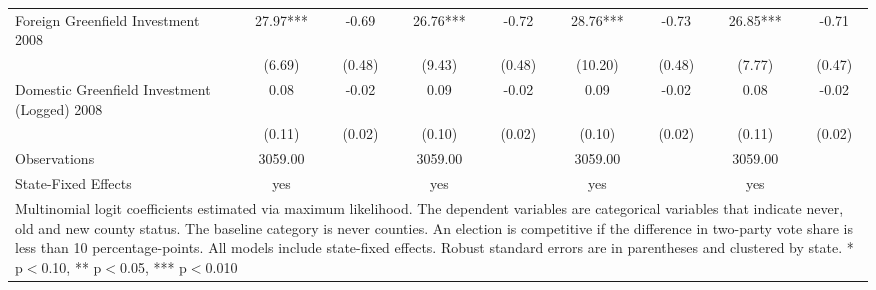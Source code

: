 \begin{table}[!htbp]
\begin{tabular}{l*{8}{c}}
Foreign Greenfield Investment 2008&       27.97***&       -0.69   &       26.76***&       -0.72   &       28.76***&       -0.73   &       26.85***&       -0.71   \\
                    &      (6.69)   &      (0.48)   &      (9.43)   &      (0.48)   &     (10.20)   &      (0.48)   &      (7.77)   &      (0.47)   \\
Domestic Greenfield Investment (Logged) 2008&        0.08   &       -0.02   &        0.09   &       -0.02   &        0.09   &       -0.02   &        0.08   &       -0.02   \\
                    &      (0.11)   &      (0.02)   &      (0.10)   &      (0.02)   &      (0.10)   &      (0.02)   &      (0.11)   &      (0.02)   \\
\hline
Observations        &     3059.00   &               &     3059.00   &               &     3059.00   &               &     3059.00   &               \\
State-Fixed Effects &         yes   &               &         yes   &               &         yes   &               &         yes   &               \\
\hline\hline
\multicolumn{9}{p{\linewidth}}{\footnotesize Multinomial logit coefficients estimated via maximum likelihood. The dependent variables are categorical variables that indicate never, old and new county status. The baseline category is never counties. An election is competitive if the difference in two-party vote share is less than 10 percentage-points. All models include state-fixed effects. Robust standard errors are in parentheses and clustered by state. * p$<$0.10, ** p$<$0.05, *** p$<$0.010}\\
\end{tabular}
\end{table}
